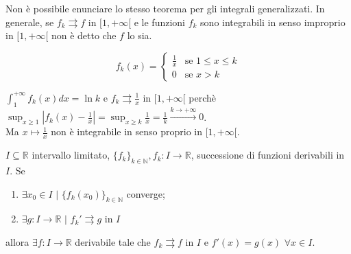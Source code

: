 \begin{attbar}
	Non è possibile enunciare lo stesso teorema per gli integrali generalizzati.  In generale, se $f_k \rightrightarrows f$ in $[1,+\infty[$ e le funzioni $f_k$ sono integrabili in senso improprio in $[1,+\infty[$ non è detto che $f$ lo sia.
\end{attbar}

\begin{equation*}
	f_k(x) =
	\begin{cases}
		\frac{1}{x} & \text{se } 1 \leq x \leq k
		\\
		0 & \text{se } x > k
	\end{cases}
\end{equation*}
\segnaposto %

$\int_{1}^{+\infty}f_k(x)dx=\ln k$ e $f_k \rightrightarrows \frac{1}{x}$ in $[1,+\infty[$ perchè $\sup_{x \geq 1}|f_k(x) -\frac{1}{x}|=\sup_{x \geq k}\frac{1}{x}=\frac{1}{k} \xrightarrow{k \rightarrow +\infty} 0$.\\
Ma $x \mapsto \frac{1}{x}$ non è integrabile in senso proprio in $[1,+\infty[$.


\begin{theorem}
	\label{th: pag 209}
	$I \subseteq \mathbb{R}$ intervallo limitato, $\{f_k\}_{k \in \mathbb{N}}, f_k: I \rightarrow \mathbb{R}$, successione di funzioni derivabili in $I$. Se 
	\begin{enumerate}
		\item $\exists x_0 \in I\,\, |\,\, \{f_k(x_0)\}_{k \in \mathbb{N}} $ converge;
		
		\item $\exists g:I \rightarrow \mathbb{R} \,\, |\,\, f_k' \rightrightarrows g$ in $I$
	\end{enumerate}
	
	allora $\exists f: I \rightarrow \mathbb{R}$ derivabile tale che $f_k\rightrightarrows f$ in $I$ e $f' (x)= g(x) \,\, \forall x \in I$.
\end{theorem}


